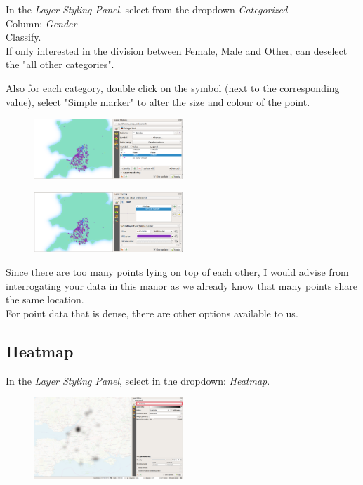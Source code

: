 In the \textit{Layer Styling Panel}, select from the dropdown \textit{Categorized}\\
Column: \textit{Gender}\\
Classify.\\

If only interested in the division between Female, Male and Other, can deselect the "all other categories".

Also for each category, double click on the symbol (next to the corresponding value), select "Simple marker" to alter the size and colour of the point.

\begin{figure}[!h]
	\centering
	\includegraphics[width=0.5\textwidth]{images/stop_search_categorized.png}%
	\caption{}
	\label{ft_fig_firstfig3}
\end{figure}

\begin{figure}[!h]
	\centering
	\includegraphics[width=0.5\textwidth]{images/stop_search_categorized_simple_marker.png}%
	\caption{}
	\label{ft_fig_firstfig3}
\end{figure}

Since there are too many points lying on top of each other, I would advise from interrogating your data in this manor as we already know that many points share the same location.\\

For point data that is dense, there are other options available to us.

\null\newpage
\subsection{Heatmap}
In the \textit{Layer Styling Panel}, select in the dropdown: \textit{Heatmap}.

\begin{figure}[!h]
	\centering
	\includegraphics[width=0.5\textwidth]{images/heatmap2.png}
	\caption{}
	\label{ft_fig_firstfig3}
\end{figure}

